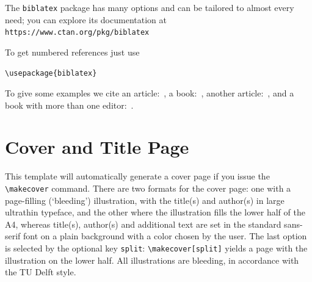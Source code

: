 The \texttt{biblatex} package has many options and can be tailored to almost
every need; you can explore its documentation at
\texttt{https://www.ctan.org/pkg/biblatex}

To get numbered references just use
\begin{verbatim}
\usepackage{biblatex}

\end{verbatim}

To give some examples we cite an article:~\cite{Einstein1906},
a book:~\cite{MR1039321}, another article:~\cite{MR3860876},
and a book with more than one editor:~\cite{MR3204729}.

\section{Cover and Title Page}

This template will automatically generate a cover page if you issue the \verb|\makecover| command. There are two formats for the cover page: one with a page-filling (`bleeding')
illustration, with the title(s) and author(s) in large ultrathin typeface, and the other where the illustration fills the lower half of the A4, whereas title(s), author(s) and additional
text are set in the standard sans-serif font on a plain background with a color chosen by the user. The last option is selected by the optional key \texttt{split}: \verb|\makecover[split]| yields
a page with the illustration on the lower half. All illustrations are bleeding, in accordance with the TU Delft style.

